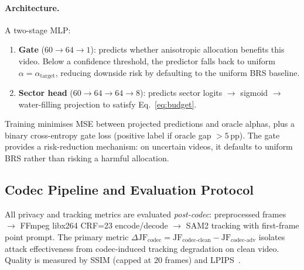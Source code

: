 \paragraph{Architecture.}
A two-stage MLP:
\begin{enumerate}
  \item \textbf{Gate} ($60 \to 64 \to 1$): predicts whether anisotropic allocation benefits this video. Below a confidence threshold, the predictor falls back to uniform $\alpha{=}\alpha_\mathrm{target}$, reducing downside risk by defaulting to the uniform BRS baseline.
  \item \textbf{Sector head} ($60 \to 64 \to 64 \to 8$): predicts sector logits $\to$ sigmoid $\to$ water-filling projection to satisfy Eq.~\ref{eq:budget}.
\end{enumerate}
Training minimises MSE between projected predictions and oracle alphas, plus a binary cross-entropy gate loss (positive label if oracle gap $> 5\,\mathrm{pp}$).
The gate provides a risk-reduction mechanism: on uncertain videos, it defaults to uniform BRS rather than risking a harmful allocation.

\subsection{Codec Pipeline and Evaluation Protocol}
\label{subsec:protocol}

All privacy and tracking metrics are evaluated \emph{post-codec}:
preprocessed frames $\to$ FFmpeg libx264 CRF=23 encode/decode $\to$ SAM2 tracking with first-frame point prompt.
The primary metric $\Delta\mathrm{JF}_\mathrm{codec} = \mathrm{JF}_\mathrm{codec\text{-}clean} - \mathrm{JF}_\mathrm{codec\text{-}adv}$ isolates attack effectiveness from codec-induced tracking degradation on clean video.
Quality is measured by SSIM (capped at 20 frames) and LPIPS~\citep{zhang2018lpips}.
